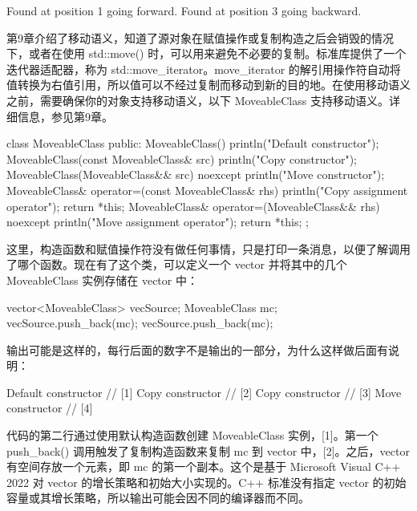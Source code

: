 \begin{shell}
Found at position 1 going forward.
Found at position 3 going backward.
\end{shell}


第9章介绍了移动语义，知道了源对象在赋值操作或复制构造之后会销毁的情况下，或者在使用 std::move() 时，可以用来避免不必要的复制。标准库提供了一个迭代器适配器，称为 std::move\_iterator。move\_iterator 的解引用操作符自动将值转换为右值引用，所以值可以不经过复制而移动到新的目的地。在使用移动语义之前，需要确保你的对象支持移动语义，以下 MoveableClass 支持移动语义。详细信息，参见第9章。

\begin{cpp}
class MoveableClass
{
    public:
        MoveableClass() {
            println("Default constructor");
        }
        MoveableClass(const MoveableClass& src) {
            println("Copy constructor");
        }
        MoveableClass(MoveableClass&& src) noexcept {
            println("Move constructor");
        }
        MoveableClass& operator=(const MoveableClass& rhs) {
            println("Copy assignment operator");
            return *this;
        }
        MoveableClass& operator=(MoveableClass&& rhs) noexcept {
            println("Move assignment operator");
            return *this;
        }
};
\end{cpp}

这里，构造函数和赋值操作符没有做任何事情，只是打印一条消息，以便了解调用了哪个函数。现在有了这个类，可以定义一个 vector 并将其中的几个 MoveableClass 实例存储在 vector 中：

\begin{cpp}
vector<MoveableClass> vecSource;
MoveableClass mc;
vecSource.push_back(mc);
vecSource.push_back(mc);
\end{cpp}

输出可能是这样的，每行后面的数字不是输出的一部分，为什么这样做后面有说明：

\begin{cpp}
Default constructor // [1]
Copy constructor // [2]
Copy constructor // [3]
Move constructor // [4]
\end{cpp}

代码的第二行通过使用默认构造函数创建 MoveableClass 实例，[1]。第一个 push\_back() 调用触发了复制构造函数来复制 mc 到 vector 中，[2]。之后，vector 有空间存放一个元素，即 mc 的第一个副本。这个是基于 Microsoft Visual C++ 2022 对 vector 的增长策略和初始大小实现的。C++ 标准没有指定 vector 的初始容量或其增长策略，所以输出可能会因不同的编译器而不同。

